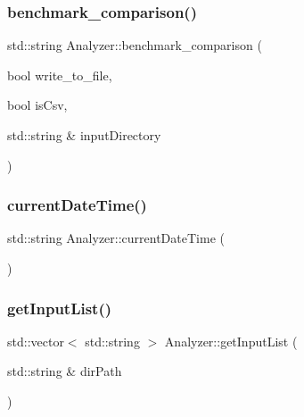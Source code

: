 \subsubsection{\texorpdfstring{benchmark\+\_\+comparison()}{benchmark\_comparison()}}
{\footnotesize\ttfamily std\+::string Analyzer\+::benchmark\+\_\+comparison (\begin{DoxyParamCaption}\item[{bool}]{write\+\_\+to\+\_\+file,  }\item[{bool}]{is\+Csv,  }\item[{std\+::string \&}]{input\+Directory }\end{DoxyParamCaption})}

\mbox{\label{class_analyzer_a9108681fee1078aed1af2ddee58cc55c_a9108681fee1078aed1af2ddee58cc55c}} 
\subsubsection{\texorpdfstring{current\+Date\+Time()}{currentDateTime()}}
{\footnotesize\ttfamily std\+::string Analyzer\+::current\+Date\+Time (\begin{DoxyParamCaption}{ }\end{DoxyParamCaption})}

\mbox{\label{class_analyzer_a7903ffdba689848dd199139e5dacf1bc_a7903ffdba689848dd199139e5dacf1bc}} 
\subsubsection{\texorpdfstring{get\+Input\+List()}{getInputList()}}
{\footnotesize\ttfamily std\+::vector$<$ std\+::string $>$ Analyzer\+::get\+Input\+List (\begin{DoxyParamCaption}\item[{std\+::string \&}]{dir\+Path }\end{DoxyParamCaption})}

\mbox{\label{class_analyzer_a471ed64111b58f49cfee911b5db93ada_a471ed64111b58f49cfee911b5db93ada}} 
